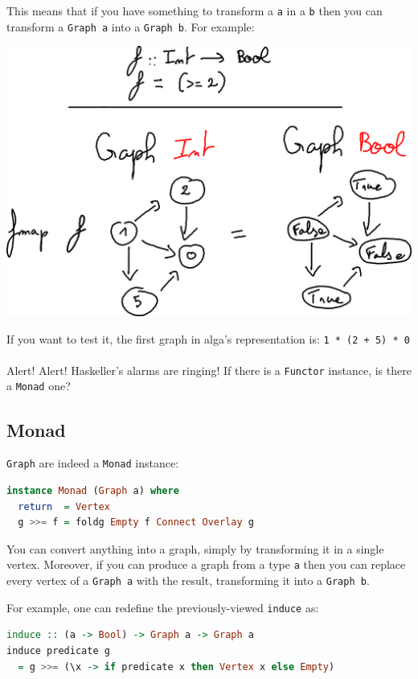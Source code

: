\documentclass[10pt,a4paper]{article}
\begin{document}
This means that if you have something to transform a \verb|a| in a \verb|b| then you can transform a \verb|Graph a| into a \verb|Graph b|. For example:

\begin{center}
	\includegraphics[scale=0.5]{figspng/fmap.png}
\end{center}

If you want to test it, the first graph in alga's representation is: \verb|1 * (2 + 5) * 0|
\\
\\
Alert! Alert! Haskeller's alarms are ringing! If there is a \verb|Functor| instance, is there a \verb|Monad| one?

\subsection{Monad}
\verb|Graph| are indeed a \verb|Monad| instance:
\begin{lstlisting}[language=Haskell, frame=single]
instance Monad (Graph a) where
  return  = Vertex
  g >>= f = foldg Empty f Connect Overlay g
\end{lstlisting}

You can convert anything into a graph, simply by transforming it in a single vertex. Moreover, if you can produce a graph from a type \verb|a| then you can replace every vertex of a \verb|Graph a| with the result, transforming it into a \verb|Graph b|.

For example, one can redefine the previously-viewed \verb|induce| as:

\begin{lstlisting}[language=Haskell, frame=single]
induce :: (a -> Bool) -> Graph a -> Graph a
induce predicate g
  = g >>= (\x -> if predicate x then Vertex x else Empty)
\end{lstlisting}
\end{document}
